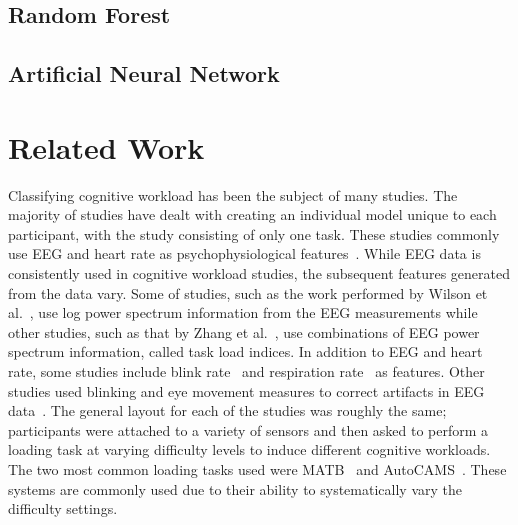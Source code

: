 \documentclass[11pt]{article}
\begin{document}
	\subsection{Random Forest}
	
	\subsection{Artificial Neural Network}

\section{Related Work}
Classifying cognitive workload has been the subject of many studies. The majority of studies have dealt with creating an individual model unique to each participant, with the study consisting of only one task. These studies commonly use EEG and heart rate as psychophysiological features~\cite{Wang_R, Zhang, Wilson, Yang}. While EEG data is consistently used in cognitive workload studies, the subsequent features generated from the data vary. Some of studies, such as the work performed by Wilson et al.~\cite{Wilson}, use log power spectrum information from the EEG measurements while other studies, such as that by Zhang et al.~\cite{Zhang}, use combinations of EEG power spectrum information, called task load indices. In addition to EEG and heart rate, some studies include blink rate~\cite{Wilson, Wilson_2002} and respiration rate~\cite{Wilson_2003} as features. Other studies used blinking and eye movement measures to correct artifacts in EEG data~\cite{Wang_R}. The general layout for each of the studies was roughly the same; participants were attached to a variety of sensors and then asked to perform a loading task at varying difficulty levels to induce different cognitive workloads. The two most common loading tasks used were MATB~\cite{Estepp} and AutoCAMS~\cite{Lorenz}. These systems are commonly used due to their ability to systematically vary the difficulty settings. 
\end{document}
